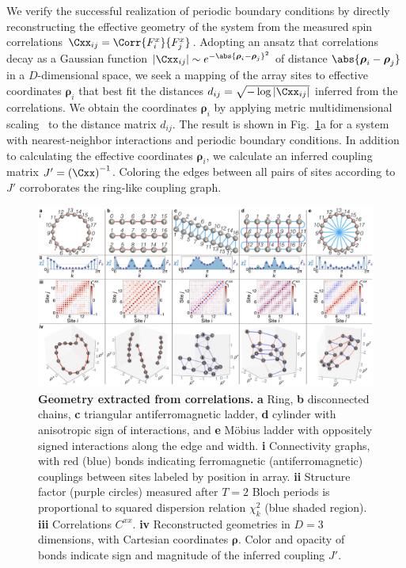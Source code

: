 \documentclass[aps,pra,twocolumn,superscriptaddress]{revtex4-1} %
\begin{document}
\begin{bibunit}
We verify the successful realization of periodic boundary conditions by directly reconstructing the effective geometry of the system from the measured spin correlations $\Cxx_{ij} = \Corr{F^x_i}{F^x_j}$.  Adopting an ansatz that correlations decay as a Gaussian function $\left|\Cxx_{ij}\right|\sim e^{-\abs{\boldsymbol{\rho}_i-\boldsymbol{\rho}_j}^2}$ of distance $\abs{\boldsymbol{\rho}_i-\boldsymbol{\rho}_j}$ in a $D$-dimensional space, we seek a mapping of the array sites to effective coordinates $\boldsymbol{\rho}_i$ that best fit the distances $d_{ij} = \sqrt{-\log |\Cxx_{ij}|}$ inferred from the correlations.  We obtain the coordinates $\boldsymbol{\rho}_i$ by applying metric multidimensional scaling~\cite{torgerson1952multidimensional} to the distance matrix $d_{ij}$.  The result is shown in Fig.~\ref{fig:geometry}a for a system with nearest-neighbor interactions and periodic boundary conditions. In addition to calculating the effective coordinates $\boldsymbol{\rho}_i$, we calculate an inferred coupling matrix $J' = \left(\Cxx\right)^{-1}$.  Coloring the edges between all pairs of sites according to $J'$ corroborates the ring-like coupling graph.

\begin{figure}[tbh]
\includegraphics[width=\textwidth]{Figures/Figure3.pdf}
\caption{\textbf{Geometry extracted from correlations.} 
\textbf{a} Ring, \textbf{b} disconnected chains, \textbf{c} triangular antiferromagnetic ladder, \textbf{d} cylinder with anisotropic sign of interactions, and \textbf{e} M\"obius ladder with oppositely signed interactions along the edge and width.  \textbf{i} Connectivity graphs, with red (blue) bonds indicating ferromagnetic (antiferromagnetic) couplings between sites labeled by position in array.  \textbf{ii} Structure factor (purple circles) measured after $T=2$ Bloch periods is proportional to squared dispersion relation $\chi_{k}^2$ (blue shaded region).  \textbf{iii} Correlations $C^{xx}$.  \textbf{iv} Reconstructed geometries in $D = 3$ dimensions, with Cartesian coordinates $\boldsymbol{\rho}$.  Color and opacity of bonds indicate sign and magnitude of the inferred coupling $J'$.}
\label{fig:geometry}
\end{figure}


\end{bibunit}
\end{document}
